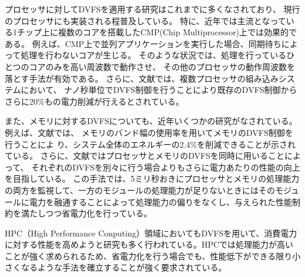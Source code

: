 プロセッサに対してDVFSを適用する研究はこれまでに多くなされており、
現行のプロセッサにも実装される程普及している。
特に、近年では主流となっている1チップ上に複数のコアを搭載したCMP(Chip Multiprocessor)上では効果的である。
例えば、CMP上で並列アプリケーションを実行した場合、同期待ちによって処理を行わないコアが生じる。
そのような状況では、処理を行っているひとつのコアのみを高い周波数で動作させ、
その他のプロセッサの動作周波数を落とす手法が有効である。
さらに、文献\cite{4658633}では、複数プロセッサの組み込みシステムにおいて、
ナノ秒単位でDVFS制御を行うことにより既存のDVFS制御からさらに20\%もの電力削減が行えるとされている。


また、メモリに対するDVFSについても、近年いくつかの研究がなされている。
例えば、文献\cite{David:2011:MPM:1998582.1998590}では、
メモリのバンド幅の使用率を用いてメモリのDVFS制御を行うことによ
り、システム全体のエネルギーの2.4\%を削減できることが示されている。
さらに、文献\cite{6493615}ではプロセッサとメモリのDVFSを同時に用いることによって、
それぞれのDVFSを別々に行う場合よりもさらに電力あたりの性能の向上を目指している。
この手法では、5ミリ秒おきにプロセッサとメモリの処理能力の両方を監視して、一方のモジュールの処理能力が足りないときにはそのモジュールに電力を融通することによって処理能力の偏りをなくし、与えられた性能制約を満たしつつ省電力化を行っている。

HPC（High Performance Conputing）領域においてもDVFSを用いて、消費電力に対する性能を高めようと研究も多く行われている\cite{Rountree:2009:AMD:1542275.1542340}。HPCでは処理能力が高いことが強く求められるため、省電力化を行う場合でも、性能低下ができる限り小さくなるような手法を確立することが強く要求されている。







